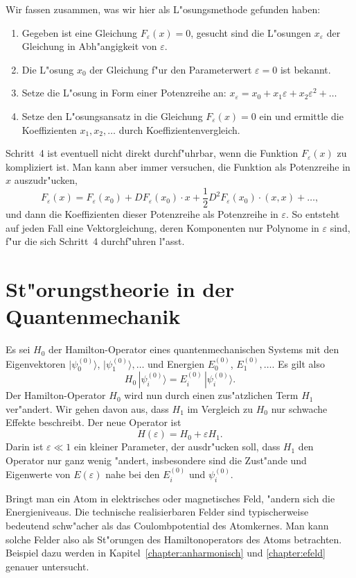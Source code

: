 Wir fassen zusammen, was wir hier als L"osungsmethode gefunden haben:
\begin{enumerate}
\item Gegeben ist eine Gleichung $F_\varepsilon(x)=0$, gesucht
sind die L"osungen $x_\varepsilon$ der Gleichung in Abh"angigkeit von
$\varepsilon$.
\item Die L"osung $x_0$ der Gleichung f"ur den Parameterwert $\varepsilon=0$
ist bekannt.
\item Setze die L"osung in Form einer Potenzreihe an:
$x_\varepsilon = x_0+x_1\varepsilon+x_2\varepsilon^2+\dots$
\item Setze den L"osungsansatz in die Gleichung $F_\varepsilon(x)=0$ ein
und ermittle die Koeffizienten $x_1,x_2,\dots$ durch Koeffizientenvergleich.
\end{enumerate}
Schritt~4 ist eventuell nicht direkt durchf"uhrbar, wenn die Funktion
$F_\varepsilon(x)$ zu kompliziert ist. Man kann aber immer versuchen, die
Funktion als Potenzreihe in $x$ auszudr"ucken, 
\[
F_\varepsilon(x)=F_\varepsilon(x_0) + DF_\varepsilon(x_0)\cdot x
+ \frac12 D^2F_\varepsilon(x_0)\cdot(x,x)+\dots,
\]
und dann die Koeffizienten dieser Potenzreihe als Potenzreihe in $\varepsilon$.
So entsteht auf jeden Fall eine Vektorgleichung, deren Komponenten nur
Polynome in $\varepsilon$ sind, f"ur die sich Schritt~4 durchf"uhren l"asst.

\section{St"orungstheorie in der Quantenmechanik}
Es sei $H_0$ der Hamilton-Operator eines quantenmechanischen Systems
mit den Eigenvektoren $|\psi_0^{(0)}\rangle$, $|\psi_1^{(0)}\rangle,\dots$
und Energien
$E_0^{(0)}$, $E_1^{(0)},\dots$.
Es gilt also 
\[
H_0\,|\psi_i^{(0)}\rangle = E_i^{(0)}\,|\psi_i^{(0)}\rangle.
\]
Der Hamilton-Operator $H_0$ wird nun durch einen zus"atzlichen Term
$H_1$ ver"andert. Wir gehen davon aus, dass $H_1$ im Vergleich zu
$H_0$ nur schwache Effekte beschreibt. Der neue Operator ist
\[
H(\varepsilon)=H_0+\varepsilon H_1.
\]
Darin ist $\varepsilon\ll 1$ ein kleiner Parameter, der ausdr"ucken
soll, dass $H_1$ den Operator nur ganz wenig "andert, insbesondere
sind die Zust"ande und Eigenwerte von $E(\varepsilon)$ nahe bei 
den $E_i^{(0)}$ und $\psi_i^{(0)}$.

Bringt man ein Atom in elektrisches oder magnetisches Feld, "andern
sich die Energieniveaus.
Die technische realisierbaren Felder sind typischerweise bedeutend
schw"acher als das Coulombpotential des Atomkernes.
Man kann solche Felder also als St"orungen des Hamiltonoperators
des Atoms betrachten.
Beispiel dazu werden in Kapitel~\ref{chapter:anharmonisch} und
\ref{chapter:efeld} genauer untersucht.

